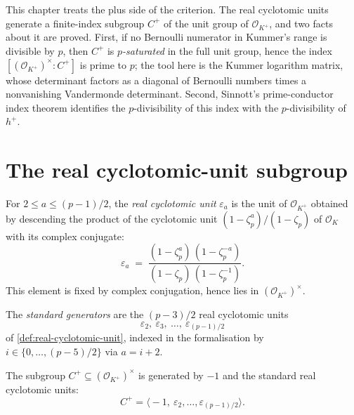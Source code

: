 
This chapter treats the plus side of the criterion.  The real cyclotomic
units generate a finite-index subgroup $C^+$ of the unit group of
$\mathcal O_{K^+}$, and two facts about it are proved.  First, if no
Bernoulli numerator in Kummer's range is divisible by $p$, then $C^+$ is
\emph{$p$-saturated} in the full unit group, hence the index
$[(\mathcal O_{K^+})^\times : C^+]$ is prime to $p$; the tool here is the
Kummer logarithm matrix, whose determinant factors as a diagonal of
Bernoulli numbers times a nonvanishing Vandermonde determinant.  Second,
Sinnott's prime-conductor index theorem \cite{sinnott1978} identifies the
$p$-divisibility of this index with the $p$-divisibility of $h^+$.

\section{The real cyclotomic-unit subgroup}

\begin{definition}\label{def:real-cyclotomic-unit}
  \leanok
For $2\le a\le (p-1)/2$, the \emph{real cyclotomic unit} $\varepsilon_a$ is
the unit of $\mathcal O_{K^+}$ obtained by descending the product of the
cyclotomic unit $(1-\zeta_p^a)/(1-\zeta_p)$ of $\mathcal O_K$ with its
complex conjugate:
\[
  \varepsilon_a
  \;=\;
  \frac{(1-\zeta_p^a)\,(1-\zeta_p^{-a})}{(1-\zeta_p)\,(1-\zeta_p^{-1})} .
\]
This element is fixed by complex conjugation, hence lies in
$(\mathcal O_{K^+})^\times$.
\end{definition}

\begin{definition}\label{def:CPlus-generator}
  \leanok
The \emph{standard generators} are the $(p-3)/2$ real cyclotomic units
\[
  \varepsilon_2,\ \varepsilon_3,\ \ldots,\ \varepsilon_{(p-1)/2}
\]
of \cref{def:real-cyclotomic-unit}, indexed in the formalisation by
$i \in \{0, \ldots, (p-5)/2\}$ via $a = i + 2$.
\end{definition}

\begin{definition}\label{def:CPlus}
  \leanok
The subgroup $C^+\subseteq(\mathcal O_{K^+})^\times$ is generated by $-1$
and the standard real cyclotomic units:
\[
  C^+=\bigl\langle -1,\ \varepsilon_2,\ldots,\varepsilon_{(p-1)/2}
  \bigr\rangle.
\]
\end{definition}

